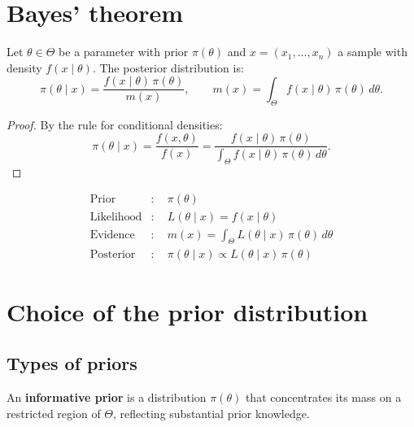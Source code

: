 \section{Bayes' theorem}

\begin{theorem}
\label{thm:bayes}
Let $\theta \in \Theta$ be a parameter with prior $\pi(\theta)$ and
$x = (x_1, \ldots, x_n)$ a sample with density $f(x \mid \theta)$.
The posterior distribution is:
\[
  \pi(\theta \mid x)
  = \frac{f(x \mid \theta)\,\pi(\theta)}{m(x)},
  \qquad
  m(x) = \int_\Theta f(x \mid \theta)\,\pi(\theta)\,d\theta.
\]
\end{theorem}

\begin{proof}
By the rule for conditional densities:
\[
  \pi(\theta \mid x)
  = \frac{f(x, \theta)}{f(x)}
  = \frac{f(x \mid \theta)\,\pi(\theta)}
         {\int_\Theta f(x \mid \theta)\,\pi(\theta)\,d\theta}.
\]
\end{proof}

\begin{keyformulas}[title=\textbf{Components of Bayes' theorem}]
\begin{align*}
  \text{Prior} &: \quad \pi(\theta) \\
  \text{Likelihood} &: \quad L(\theta \mid x) = f(x \mid \theta) \\
  \text{Evidence} &: \quad m(x) = \int_\Theta L(\theta \mid x)\,\pi(\theta)\,d\theta \\
  \text{Posterior} &: \quad \pi(\theta \mid x) \propto L(\theta \mid x)\,\pi(\theta)
\end{align*}
\end{keyformulas}

\section{Choice of the prior distribution}

\subsection{Types of priors}

\begin{definition}
An \textbf{informative prior} is a distribution $\pi(\theta)$ that
concentrates its mass on a restricted region of $\Theta$, reflecting
substantial prior knowledge.
\end{definition}

